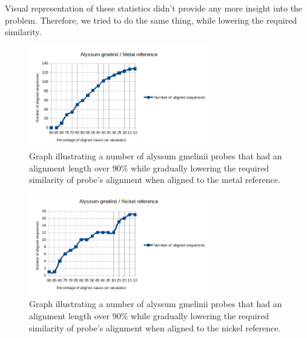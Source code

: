 Visual representation of these statistics didn't provide any more insight into the problem. 
Therefore, we tried to do the same thing, while lowering the required similarity. 

\begin{figure}
\centerline{
	\includegraphics[width=0.7\textwidth]{images/gmelinii_metal_sim.png}
}
\caption[Lowering of the required alignment similarity for succesful alignment]{Graph illustrating a number of alyssum gmelinii probes that had an alignment length over $90\%$ while gradually lowering the required similarity of probe's alignment when aligned to the metal reference.}
\label{obr:gmel_met_sim}
\end{figure}

\begin{figure}
\centerline{
	\includegraphics[width=0.7\textwidth]{images/gmelinii_nickel_sim.png}
}
\caption[Lowering of the required alignment similarity for succesful alignment]{Graph illustrating a number of alyssum gmelinii probes that had an alignment length over $90\%$ while gradually lowering the required similarity of probe's alignment when aligned to the nickel reference.}
\label{obr:gmel_nick_sim}
\end{figure}

